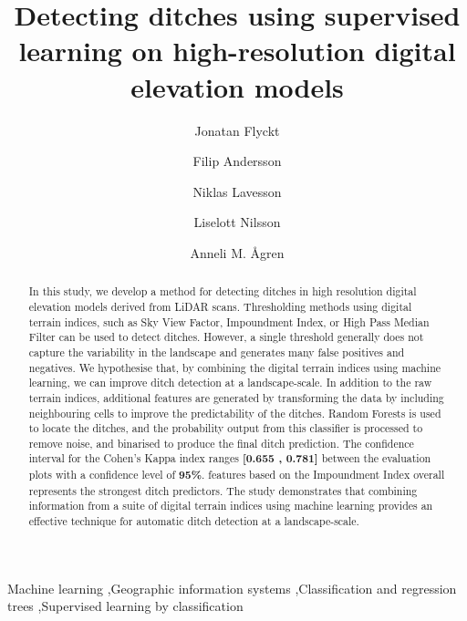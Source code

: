 \documentclass[11pt, review]{elsarticle} %
\begin{document}
\begin{frontmatter}
\title{Detecting ditches using supervised learning on high-resolution digital elevation models}

\author[ju]{Jonatan Flyckt}

\author[ju]{Filip Andersson}

\author[ju]{Niklas Lavesson }

\author[fa]{Liselott Nilsson}

\author[slu]{Anneli M. \AA gren}

\address[ju]{J\"onk\"oping Artificial Intelligence Laboratory, J\"onk\"oping University, Gjuterigatan 5, 551 11, J\"onk\"oping, Sweden}
\address[fa]{Forest Department, Swedish Forest Agency, Skeppargatan 17, 931 32 Skellefte\aa, Sweden}
\address[slu]{Department of Forest Ecology and Management, Swedish University of Agricultural Sciences, SLU, Skogsmarksgr\"and 17, 901 83, Ume\aa, Sweden}

\begin{abstract}
{\footnotesize In this study, we develop a method for detecting ditches in high resolution digital elevation models derived from LiDAR scans. Thresholding methods using digital terrain indices, such as Sky View Factor, Impoundment Index, or High Pass Median Filter can be used to detect ditches. However, a single threshold generally does not capture the variability in the landscape and generates many false positives and negatives. We hypothesise that, by combining the digital terrain indices using machine learning, we can improve ditch detection at a landscape-scale. In addition to the raw terrain indices, additional features are generated by transforming the data by including neighbouring cells to improve the predictability of the ditches. Random Forests is used to locate the ditches, and the probability output from this classifier is processed to remove noise, and binarised to produce the final ditch prediction. The confidence interval for the Cohen's Kappa index ranges \textbf{[0.655 , 0.781]} between the evaluation plots with a confidence level of \textbf{95\%}. features based on the Impoundment Index overall represents the strongest ditch predictors. The study demonstrates that combining information from  a suite of digital terrain indices using machine learning provides an effective technique for automatic ditch detection at a landscape-scale.}
\end{abstract}

\begin{keyword}
{\footnotesize
Machine learning \sep Geographic information systems \sep Classification and regression trees \sep Supervised learning by classification}
\end{keyword}

\end{frontmatter}
\end{document}
